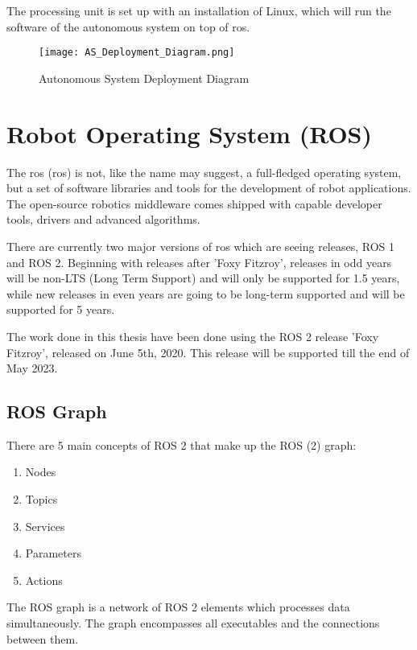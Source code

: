 The processing unit is set up with an installation of Linux, which will run the software of the autonomous system on top of \acrshort{ros}.
\begin{figure}[H]
    \centering
    \texttt{[image: AS\_Deployment\_Diagram.png]}
    \caption{Autonomous System Deployment Diagram}
    \label{fig:AS Deployment Diagram}
\end{figure}

\section{Robot Operating System (ROS)}
The \acrlong{ros} (\acrshort{ros}) is not, like the name may suggest, a full-fledged operating system, but a set of software libraries and tools for the development of robot applications. The open-source robotics middleware comes shipped with capable developer tools, drivers and advanced algorithms. \cite{ros2_documentation}

There are currently two major versions of \acrshort{ros} which are seeing releases, ROS 1 and ROS 2. \cite{ros2_distributions} Beginning with releases after 'Foxy Fitzroy', releases in odd years will be non-LTS (Long Term Support) and will only be supported for 1.5 years, while new releases in even years are going to be long-term supported and will be supported for 5 years. \cite{ros2_releases_and_target_platforms}

The work done in this thesis have been done using the ROS 2 release 'Foxy Fitzroy', released on June 5th, 2020. This release will be supported till the end of May 2023. \cite{ros2_distributions}

\subsection{ROS Graph}
There are 5 main concepts of ROS 2 that make up the ROS (2) graph:
\begin{enumerate}
    \item Nodes
    \item Topics
    \item Services
    \item Parameters
    \item Actions
\end{enumerate}

The ROS graph is a network of ROS 2 elements which processes data simultaneously. The graph encompasses all executables and the connections between them.


